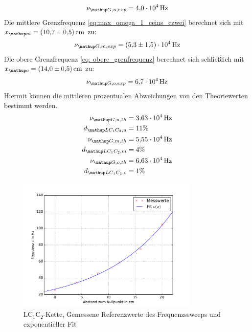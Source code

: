 \begin{equation}
  \nu\ua{G, u, exp} = \SI{4.0e4}{\hertz}
\end{equation}
Die mittlere Grenzfrequenz \eqref{eq:max_omega_1_ceins_czwei} berechnet sich mit $x\ua{m} = \SI{10.7(5)}{\cm}$ zu:
\begin{equation}
    \nu\ua{G, m, exp} = \SI{5.3(15)e4}{\hertz}
\end{equation}
Die obere Grenzfrequenz \eqref{eq: obere_grenfrequenz} berechnet sich schließlich mit $x\ua{o} = \SI{14.0(5)}{\cm}$ zu:
\begin{equation}
    \nu\ua{G, o, exp} = \SI{6.7e4}{\hertz}
\end{equation}
Hiermit können die mittleren prozentualen Abweichungen von den Theoriewerten bestimmt werden.
\begin{align}
  \begin{aligned}
  \nu\ua{G,u,th} &= \SI{3.63e4}{\hertz}\\
  d\ua{LC_1C_2,u} &= 11 \%\\
  \nu\ua{G,m,th} &= \SI{5.55e4}{\hertz}\\
  d\ua{LC_1C_2, m} &= 4 \%\\
  \nu\ua{G,o,th} &= \SI{6.63e4}{\hertz}\\
  d\ua{LC_1C_2, o} &= 1 \%
\end{aligned}
\end{align}
\FloatBarrier
\begin{figure}
  \centering
  \includegraphics[width = 0.8\textwidth]{../Messdaten/plots/frequenzsweep_LC1C2.pdf}
  \caption{$\mathup{LC_1C_2}$-Kette, Gemessene Referenzwerte des Frequenzssweeps und exponentieller Fit}
  \label{fig: plot_sweep_LC1C2}
\end{figure}
\newpage
